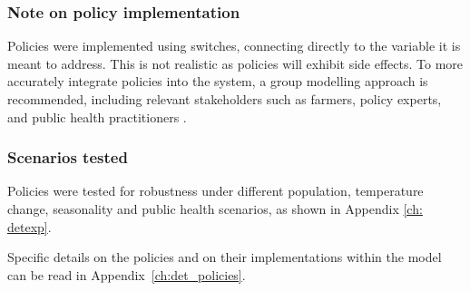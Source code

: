 \subsubsection*{Note on policy implementation}
Policies were implemented using switches, connecting directly to the variable it is meant to address. This is not realistic as policies will exhibit side effects. To more accurately integrate policies into the system,  a group modelling approach is recommended, including relevant stakeholders such as farmers, policy experts, and public health practitioners \parencite{vennix_group_1999}. %

\subsubsection{Scenarios tested}
Policies were tested for robustness under different population, temperature change, seasonality and public health scenarios, as shown in Appendix \ref{ch: detexp}.


Specific details on the policies and on their implementations within the model can be read in Appendix~\ref{ch:det_policies}.